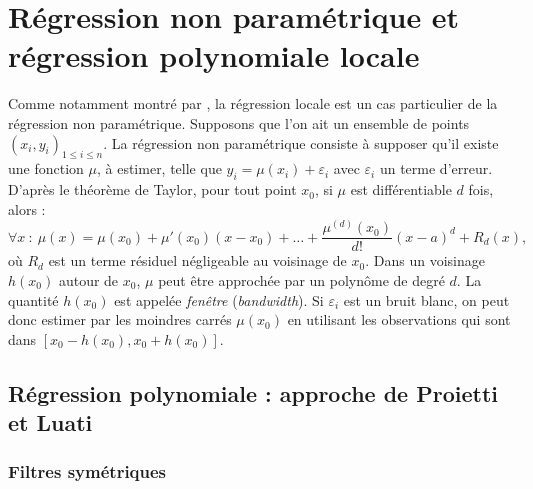 \documentclass[
  12pt,
  french,
  12pt,a4paper]{article}
\newcommand\1{\mathds{1}}
\begin{document}
\hypertarget{sec-nonparamreg}{%
\section{Régression non paramétrique et régression polynomiale locale}\label{sec-nonparamreg}}

Comme notamment montré par \textcite{Loader1999}, la régression locale est un cas particulier de la régression non paramétrique.
Supposons que l'on ait un ensemble de points \((x_i,y_i)_{1\leq i\leq n}\).
La régression non paramétrique consiste à supposer qu'il existe une fonction \(\mu\), à estimer, telle que \(y_i=\mu(x_i)+\varepsilon_i\) avec \(\varepsilon_i\) un terme d'erreur.
D'après le théorème de Taylor, pour tout point \(x_0\), si \(\mu\) est différentiable \(d\) fois, alors :
\[
\forall x \::\:\mu(x) = \mu(x_0) + \mu'(x_0)(x-x_0)+\dots +
\frac{\mu^{(d)}(x_0)}{d!}(x-a)^d+R_d(x),
\]
où \(R_d\) est un terme résiduel négligeable au voisinage de \(x_0\).
Dans un voisinage \(h(x_0)\) autour de \(x_0\), \(\mu\) peut être approchée par un polynôme de degré \(d\).
La quantité \(h(x_0)\) est appelée \emph{fenêtre} (\emph{bandwidth}).
Si \(\varepsilon_i\) est un bruit blanc, on peut donc estimer par les moindres carrés \(\mu(x_0)\) en utilisant les observations qui sont dans \(\left[x_0-h(x_0),x_0+h(x_0)\right]\).

\hypertarget{sec-proietti}{%
\subsection{Régression polynomiale : approche de Proietti et Luati}\label{sec-proietti}}

\hypertarget{filtres-symuxe9triques}{%
\subsubsection{Filtres symétriques}\label{filtres-symuxe9triques}}
\end{document}
